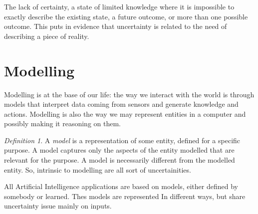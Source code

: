 \documentclass[12pt, a4paper]{report}
\theoremstyle{remark}
\newtheorem*{remark}{Definition}
\theoremstyle{definition}
\begin{document}
    The lack of certainty, a state of limited knowledge where it is impossible to exactly describe the existing state, a future outcome,
    or more than one possible outcome. This puts in evidence that uncertainty is related to the need of describing a piece of reality.

    \section{Modelling}
    Modelling is at the base of our life: the way we interact with the world is through models that interpret data coming from sensors
    and generate knowledge and actions. Modelling is also the way we may represent entities in a computer and possibly making it reasoning
    on them.
    \begin{remark}
        A \emph{model} is a representation of some entity, defined for a specific purpose. A model captures only the aspects of the entity
        modelled that are relevant for the purpose. A model is necessarily different from the modelled entity. So, intrinsic to modelling
        are all sort of uncertainities.
    \end{remark}
    All Artificial Intelligence applications are based on models, either defined by somebody or learned. Thes models are represented In
    different ways, but share uncertainty issue mainly on inputs. 
\end{document}
